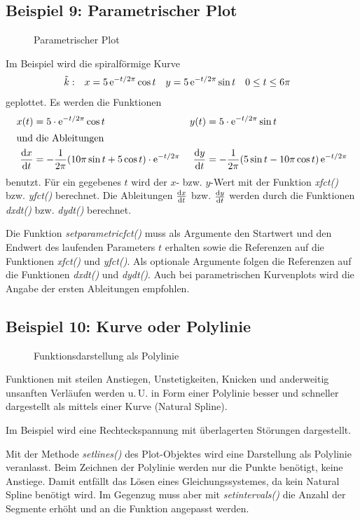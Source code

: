 \documentclass[ngerman,origlongtable]{scrartcl}
\newcommand{\includepgfimage}[2]{%
\begin{figure}%
{\centering%
\caption{#2}\label{fig:#1}%
}%
\end{figure}%
}
\begin{document}
\subsection[Parametrischer Plot]{Beispiel 9: Parametrischer Plot}
\includepgfimage{../examples/test009a}{Parametrischer Plot}
Im Beispiel wird die spiralförmige Kurve
\begin{align*}
\tilde{k}:&&x&=5\operatorname{e}^{-t/2\pi}\cos{t}&y&=5\operatorname{e}^{-t/2\pi}\sin{t}&0&\leq{}t\leq{}6\pi
\end{align*}
geplottet.
Es werden die Funktionen
\begin{align*}
x(t)&=5\cdot\operatorname{e}^{-t/2\pi}\cos{t}&y(t)&=5\cdot\operatorname{e}^{-t/2\pi}\sin{t}\\
\intertext{und die Ableitungen}
\frac{\mathrm{d} x}{\mathrm{d} t}&=-\frac{1}{2\pi}(10\pi\sin{t}+5\cos{t})\cdot\operatorname{e}^{-t/2\pi}&\frac{\mathrm{d} y}{\mathrm{d} t}&=-\frac{1}{2\pi}(5\sin{t}-10\pi\cos{t})\operatorname{e}^{-t/2\pi}\end{align*}
benutzt. Für ein gegebenes \(t\) wird der \(x\)- bzw. \(y\)-Wert mit der
Funktion \textit{xfct()\/} bzw. \textit{yfct()\/} berechnet.
Die Ableitungen \(\tfrac{\mathrm{d} x}{\mathrm{d} t}\) bzw. \(\tfrac{\mathrm{d} y}{\mathrm{d} t}\)
werden durch die Funktionen \textit{dxdt()\/} bzw. \textit{dydt()\/}
berechnet.

Die Funktion
\textit{set\textunderscore{}parametric\textunderscore{}fct()\/}
muss als Argumente den Startwert und den Endwert des laufenden Parameters
\(t\) erhalten sowie die Referenzen auf die Funktionen
\textit{xfct()\/} und \textit{yfct()\/}. Als optionale Argumente folgen
die Referenzen auf die Funktionen
\textit{dxdt()\/} und \textit{dydt()\/}. Auch bei parametrischen
Kurvenplots wird die Angabe der ersten Ableitungen empfohlen.

\clearpage
\subsection[Polylinie]{Beispiel 10: Kurve oder Polylinie}
\includepgfimage{../examples/test011a}{Funktionsdarstellung als Polylinie}
Funktionen mit steilen Anstiegen, Unstetigkeiten, Knicken und
anderweitig unsanften
Verläufen werden u.\,U. in Form einer Polylinie
besser und schneller dargestellt als mittels einer Kurve (Natural Spline).

Im Beispiel wird eine Rechteckspannung mit überlagerten Störungen
dargestellt.

Mit der Methode
\textit{set\textunderscore{}lines()\/} des Plot-Objektes wird eine Darstellung
als Polylinie veranlasst. Beim Zeichnen der Polylinie werden nur die
Punkte benötigt, keine Anstiege. Damit entfällt das Lösen eines
Gleichungssystemes, da kein Natural Spline benötigt wird. Im Gegenzug muss
aber mit
\textit{set\textunderscore{}intervals()\/} die Anzahl der Segmente erhöht und
an die Funktion angepasst werden.
\clearpage

\clearpage
\end{document}
